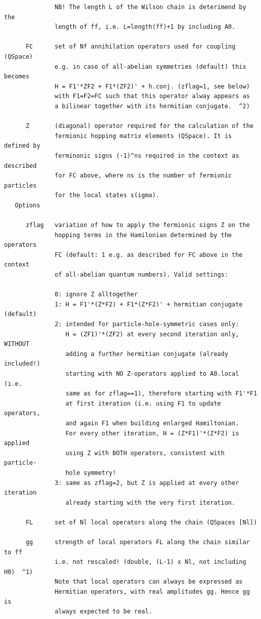 \documentclass[twoside,12pt]{article}
\begin{document}
\begin{verbatim}
              NB! The length L of the Wilson chain is deterimend by the
              length of ff, i.e. L=length(ff)+1 by including A0.
 
      FC      set of Nf annihilation operators used for coupling (QSpace)
              e.g. in case of all-abelian symmetries (default) this becomes
              H = F1'*ZF2 + F1*(ZF2)' + h.conj. (zflag=1, see below)
              with F1=F2=FC such that this operator alway appears as 
              a bilinear together with its hermitian conjugate.  ^2)
 
      Z       (diagonal) operator required for the calculation of the
              fermionic hopping matrix elements (QSpace). It is defined by
              ferminonic signs (-1)^ns required in the context as described
              for FC above, where ns is the number of fermionic particles
              for the local states s(igma).
   Options
 
      zflag   variation of how to apply the fermionic signs Z on the
              hopping terms in the Hamilonian determined by the operators
              FC (default: 1 e.g. as described for FC above in the context
              of all-abelian quantum numbers). Valid settings:
 
              0: ignore Z alltogether
              1: H = F1'*(Z*F2) + F1*(Z*F2)' + hermitian conjugate (default)
              2: intended for particle-hole-symmetric cases only:
                 H = (ZF1)'*(ZF2) at every second iteration only, WITHOUT
                 adding a further hermitian conjugate (already included!)
                 starting with NO Z-operators applied to A0.local (i.e.
                 same as for zflag==1), therefore starting with F1'*F1
                 at first iteration (i.e. using F1 to update operators,
                 and again F1 when building enlarged Hamiltonian.
                 For every other iteration, H = (Z*F1)'*(Z*F2) is applied
                 using Z with BOTH operators, consistent with particle-
                 hole symmetry!
              3: same as zflag=2, but Z is applied at every other iteration
                 already starting with the very first iteration.
 
      FL      set of Nl local operators along the chain (QSpaces [Nl])
 
      gg      strength of local operators FL along the chain similar to ff
              i.e. not rescaled! (double, (L-1) x Nl, not including H0)  ^1)
              Note that local operators can always be expressed as
              Hermitian operators, with real amplitudes gg. Hence gg is
              always expected to be real.
 

\end{verbatim}
\end{document}
